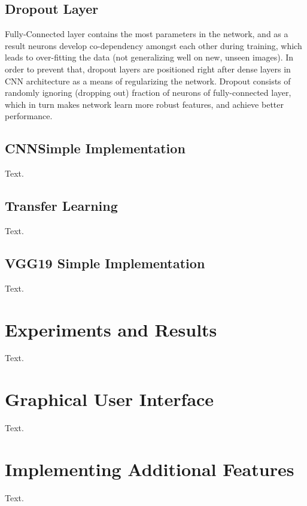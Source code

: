 \subsection{Dropout Layer}

Fully-Connected layer contains the most parameters in the network, and as a result neurons develop co-dependency amongst each other during training, which leads to over-fitting the data (not generalizing well on new, unseen images). In order to prevent that, dropout layers are positioned right after dense layers in CNN architecture as a means of regularizing the network. Dropout consists of randomly ignoring (dropping out) fraction of neurons of fully-connected layer, which in turn makes network learn more robust features, and achieve better performance.
\clearpage

\subsection{CNNSimple Implementation}

Text.

\subsection{Transfer Learning}

Text.

\subsection{VGG19 Simple Implementation}

Text.

\section{Experiments and Results}

Text.

\section{Graphical User Interface} \label{gui}

Text.

\section{Implementing Additional Features}

Text.
